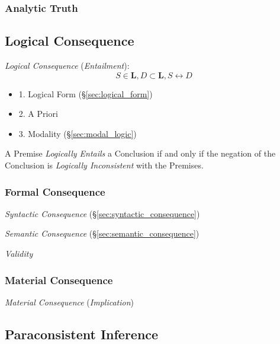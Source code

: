 \subsubsection{Analytic Truth}\label{sec:analytic_truth}



\subsection{Logical Consequence}\label{sec:logical_consequence}
\cite{beall-restall05}

\emph{Logical Consequence} (\emph{Entailment}):
\[
    S \in \mathbf{L}, D \subset \mathbf{L}, S \leftrightarrow D
\]
\begin{itemize}
    \item 1. Logical Form (\S\ref{sec:logical_form})
    \item 2. A Priori
    \item 3. Modality (\S\ref{sec:modal_logic})
\end{itemize}

A Premise \emph{Logically Entails} a Conclusion if and only if the
negation of the Conclusion is \emph{Logically Inconsistent} with the
Premises.



\subsubsection{Formal Consequence}\label{sec:formal_consequence}

\emph{Syntactic Consequence} (\S\ref{sec:syntactic_consequence})

\emph{Semantic Consequence} (\S\ref{sec:semantic_consequence})

\emph{Validity}



\subsubsection{Material Consequence}

\emph{Material Consequence} (\emph{Implication})



\subsection{Paraconsistent Inference}\label{sec:paraconsistent_inference}
\cite{priest-tanaka-weber13}

